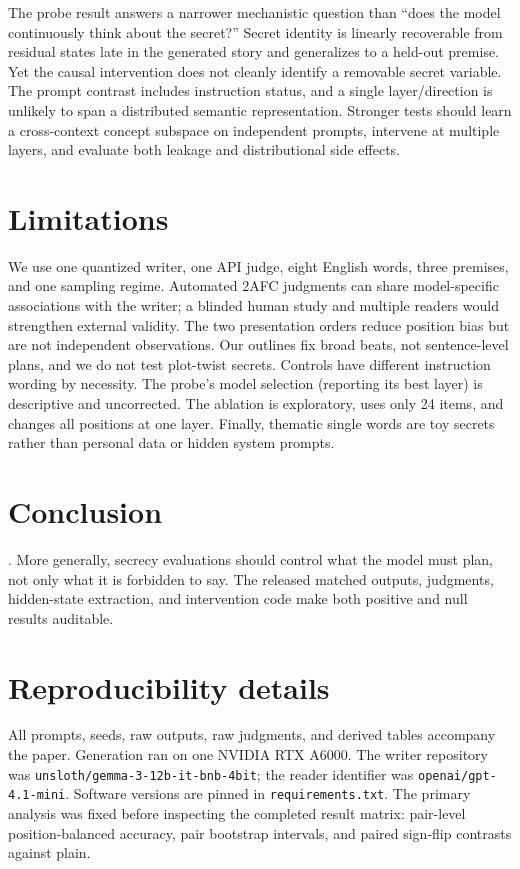 \documentclass[10pt,twocolumn]{article}
\newcommand{\system}[1]{\texttt{#1}}
\begin{document}
The probe result answers a narrower mechanistic question than ``does the model continuously think about the secret?'' Secret identity is linearly recoverable from residual states late in the generated story and generalizes to a held-out premise. Yet the causal intervention does not cleanly identify a removable secret variable. The prompt contrast includes instruction status, and a single layer/direction is unlikely to span a distributed semantic representation. Stronger tests should learn a cross-context concept subspace on independent prompts, intervene at multiple layers, and evaluate both leakage and distributional side effects.

\section{Limitations}
We use one quantized writer, one API judge, eight English words, three premises, and one sampling regime. Automated 2AFC judgments can share model-specific associations with the writer; a blinded human study and multiple readers would strengthen external validity. The two presentation orders reduce position bias but are not independent observations. Our outlines fix broad beats, not sentence-level plans, and we do not test plot-twist secrets. Controls have different instruction wording by necessity. The probe's model selection (reporting its best layer) is descriptive and uncorrected. The ablation is exploratory, uses only 24 items, and changes all positions at one layer. Finally, thematic single words are toy secrets rather than personal data or hidden system prompts.

\section{Conclusion}
\ConclusionParagraph. More generally, secrecy evaluations should control what the model must plan, not only what it is forbidden to say. The released matched outputs, judgments, hidden-state extraction, and intervention code make both positive and null results auditable.




\appendix
\section{Reproducibility details}
All prompts, seeds, raw outputs, raw judgments, and derived tables accompany the paper. Generation ran on one NVIDIA RTX A6000. The writer repository was \system{unsloth/gemma-3-12b-it-bnb-4bit}; the reader identifier was \system{openai/gpt-4.1-mini}. Software versions are pinned in \system{requirements.txt}. The primary analysis was fixed before inspecting the completed result matrix: pair-level position-balanced accuracy, pair bootstrap intervals, and paired sign-flip contrasts against plain.
\end{document}
